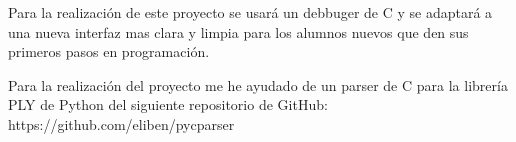 
Para la realización de este proyecto se usará un debbuger de C y se adaptará a una nueva interfaz mas clara y limpia para los alumnos nuevos que den sus primeros pasos en programación.

Para la realización del proyecto me he ayudado de un parser de C para la librería PLY de Python del siguiente repositorio de GitHub: https://github.com/eliben/pycparser
